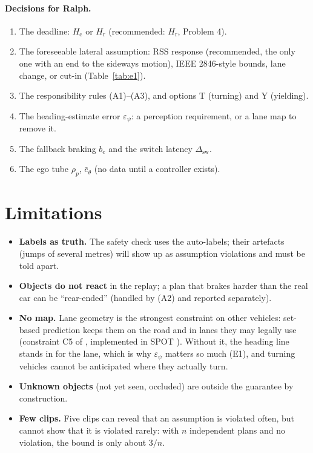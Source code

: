 \documentclass[11pt]{article}
\theoremstyle{definition}
\theoremstyle{remark}
\newcommand{\Hc}{H_{\mathrm{c}}}
\newcommand{\Hr}{H_{\mathrm{r}}}
\begin{document}
\paragraph{Decisions for Ralph.}
\begin{enumerate}[label=D\arabic*.,leftmargin=*]
  \item The deadline: $\Hc$ or $\Hr$ (recommended: $\Hr$, Problem 4).
  \item The foreseeable lateral assumption: RSS response (recommended, the only one with an end to the
    sideways motion), IEEE 2846-style bounds, lane change, or cut-in (Table~\ref{tab:e1}).
  \item The responsibility rules (A1)--(A3), and options T (turning) and Y (yielding).
  \item The heading-estimate error $\varepsilon_\psi$: a perception requirement, or a lane map to remove it.
  \item The fallback braking $b_e$ and the switch latency $\Delta_{\mathrm{sw}}$.
  \item The ego tube $\rho_p$, $\bar e_\theta$ (no data until a controller exists).
\end{enumerate}

\section{Limitations}\label{sec:limits}
\begin{itemize}[leftmargin=*]
  \item \textbf{Labels as truth.} The safety check uses the auto-labels; their artefacts (jumps of several
    metres) will show up as assumption violations and must be told apart.
  \item \textbf{Objects do not react} in the replay; a plan that brakes harder than the real car can be
    ``rear-ended'' (handled by (A2) and reported separately).
  \item \textbf{No map.} Lane geometry is the strongest constraint on other vehicles: set-based
    prediction keeps them on the road and in lanes they may legally use (constraint C5 of
    \cite{althoff2016}, implemented in SPOT \cite{koschi2017}). Without it, the heading line stands in for the
    lane, which is why $\varepsilon_\psi$ matters so much (E1), and turning vehicles cannot be anticipated
    where they actually turn.
  \item \textbf{Unknown objects} (not yet seen, occluded) are outside the guarantee by construction.
  \item \textbf{Few clips.} Five clips can reveal that an assumption is violated often, but cannot show that
    it is violated rarely: with $n$ independent plans and no violation, the bound is only about $3/n$.
\end{itemize}
\end{document}
